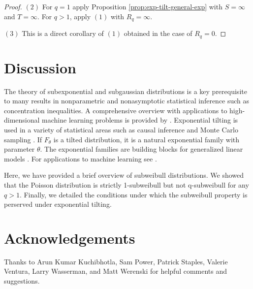 \documentclass{article}
\theoremstyle{definition}
\begin{document}
\begin{proof}
$(2)$ For $q=1$ apply Proposition \ref{prop:exp-tilt-general-exp} with $S=\infty$ and $T=\infty$. For $q>1$, apply $(1)$ with $R_q=\infty$. 

$(3)$ This is a direct corollary of $(1)$ obtained in the case of $R_q=0$.
\end{proof}

\section{Discussion}

The theory of subexponential and subgaussian distributions is a key prerequisite to many results in nonparametric and nonasymptotic statistical inference such as concentration inequalities. A comprehensive overview with applications to high-dimensional machine learning problems is provided by \cite{kuchibhotlaMovingSubGaussianityHighdimensional2022}. Exponential tilting is used in a variety of statistical areas such as causal inference \cite{mccleanNonparametricEstimationConditional2024} and Monte Carlo sampling \cite{fuhEfficientExponentialTilting2024}. If $F_\theta$ is a tilted distribution, it is a natural exponential family with parameter $\theta$. The exponential families are building blocks for generalized linear models \cite{mccullaghGeneralizedLinearModels1989}. For applications to machine learning see \cite{liTiltedLossesMachine2023,maityUnderstandingNewTasks2023}.

Here, we have provided a brief overview of subweibull distributions. We showed that the Poisson distribution is strictly 1-subweibull but not q-subweibull for any $q>1$. Finally, we detailed the conditions under which the subweibull property is perserved under exponential tilting. 

\section*{Acknowledgements}
Thanks to Arun Kumar Kuchibhotla, Sam Power, Patrick Staples, Valerie Ventura, Larry Wasserman, and Matt Werenski for helpful comments and suggestions.


% 


\end{document}
